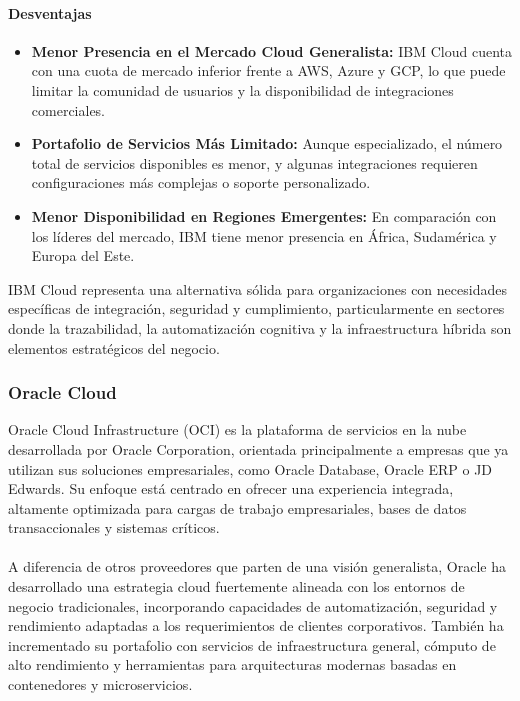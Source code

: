 {                \paragraph{Desventajas}
                
                \begin{itemize}
                    \item \textbf{Menor Presencia en el Mercado Cloud Generalista:} IBM Cloud cuenta con una cuota de mercado inferior frente a AWS, Azure y GCP, lo que puede limitar la comunidad de usuarios y la disponibilidad de integraciones comerciales.
                    \item \textbf{Portafolio de Servicios Más Limitado:} Aunque especializado, el número total de servicios disponibles es menor, y algunas integraciones requieren configuraciones más complejas o soporte personalizado.
                    \item \textbf{Menor Disponibilidad en Regiones Emergentes:} En comparación con los líderes del mercado, IBM tiene menor presencia en África, Sudamérica y Europa del Este.
                \end{itemize}
                
                IBM Cloud representa una alternativa sólida para organizaciones con necesidades específicas de integración, seguridad y cumplimiento, particularmente en sectores donde la trazabilidad, la automatización cognitiva y la infraestructura híbrida son elementos estratégicos del negocio.
                
            \subsubsection{Oracle Cloud}
                Oracle Cloud Infrastructure (OCI) es la plataforma de servicios en la nube desarrollada por Oracle Corporation, orientada principalmente a empresas que ya utilizan sus soluciones empresariales, como Oracle Database, Oracle ERP o JD Edwards. Su enfoque está centrado en ofrecer una experiencia integrada, altamente optimizada para cargas de trabajo empresariales, bases de datos transaccionales y sistemas críticos. 
                
                \paragraph{}A diferencia de otros proveedores que parten de una visión generalista, Oracle ha desarrollado una estrategia cloud fuertemente alineada con los entornos de negocio tradicionales, incorporando capacidades de automatización, seguridad y rendimiento adaptadas a los requerimientos de clientes corporativos. También ha incrementado su portafolio con servicios de infraestructura general, cómputo de alto rendimiento y herramientas para arquitecturas modernas basadas en contenedores y microservicios.
                
}
